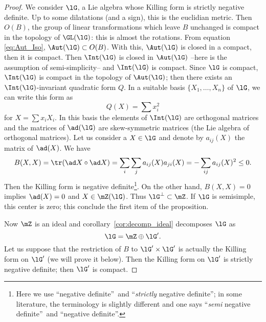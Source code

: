 \begin{proof}
We consider $\lG$, a Lie algebra whose Killing form is strictly negative definite. Up to some dilatations (and a sign), this is the euclidian metric. Then $O(B)$, the group of linear transformations which leave $B$ unchanged is compact in the topology of $\GL(\lG)$: this is almost the rotations. From equation \eqref{eq:Aut_Iso}, $\Aut(\lG)\subset O(B)$. With this, $\Aut(\lG)$ is closed in a compact, then it is compact. Then $\Int(\lG)$ is closed in $\Aut(\lG)$ --here is the assumption of semi-simplicity-- and $\Int(\lG)$ is compact.
Since $\lG$ is compact, $\Int(\lG)$ is compact in the topology of $\Aut(\lG)$; then there exists an $\Int(\lG)$-invariant quadratic form $Q$. In a suitable basis $\{X_1,\ldots,X_n\}$ of $\lG$, we can write this form as
\[
   Q(X)=\sum x_i^2
\]
for $X=\sum x_iX_i$. In this basis the elements of $\Int(\lG)$ are orthogonal matrices and the matrices of $\ad(\lG)$ are skew-symmetric matrices (the Lie algebra of orthogonal matrices). Let us consider a $X\in\lG$ and denote by $a_{ij}(X)$ the matrix of $\ad(X)$. We have
\begin{equation}
\begin{split}
  B(X,X)=\tr(\ad X\circ\ad X)
        =\sum_i\sum_ja_{ij}(X)a_{ji}(X)
    =-\sum_{ij}a_{ij}(X)^2\leq 0.
\end{split}
\end{equation}
Then the Killing form is negative definite\footnote{Here we use ``negative definite''\ and ``\emph{strictly} negative definite''; in some literature, the terminology is slightly different and one says ``\emph{semi} negative definite''\ and ``negative definite''.}. On the other hand, $B(X,X)=0$ implies $\ad(X)=0$ and $X\in\mZ(\lG)$. Thus $\lG^{\perp}\subset\mZ$. If $\lG$ is semisimple, this center is zero; this conclude the first item of the proposition.

Now $\mZ$ is an ideal and corollary~\ref{cor:decomp_ideal} decomposes $\lG$ as
\begin{equation}
  \lG=\mZ\oplus\lG'.
\end{equation}
Let us suppose that the restriction of $B$ to $\lG'\times\lG'$ is actually the Killing form on $\lG'$ (we will prove it below). Then the Killing form on $\lG'$ is strictly negative definite; then $\lG'$ is compact.


\end{proof}

